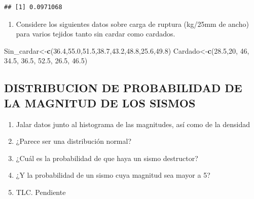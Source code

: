 \documentclass[
]{article}
\newenvironment{Shaded}{\begin{snugshade}}{\end{snugshade}}
\newcommand{\DecValTok}[1]{\textcolor[rgb]{0.00,0.00,0.81}{#1}}
\newcommand{\FloatTok}[1]{\textcolor[rgb]{0.00,0.00,0.81}{#1}}
\newcommand{\FunctionTok}[1]{\textcolor[rgb]{0.13,0.29,0.53}{\textbf{#1}}}
\newcommand{\NormalTok}[1]{#1}
\newcommand{\OtherTok}[1]{\textcolor[rgb]{0.56,0.35,0.01}{#1}}
\providecommand{\tightlist}{%
  \setlength{\itemsep}{0pt}\setlength{\parskip}{0pt}}
\begin{document}
\begin{verbatim}
## [1] 0.0971068
\end{verbatim}

\begin{enumerate}
\def\labelenumi{\arabic{enumi})}
\setcounter{enumi}{1}
\tightlist
\item
  Considere los siguientes datos sobre carga de ruptura (kg/25mm de
  ancho) para varios tejidos tanto sin cardar como cardados.
\end{enumerate}

\begin{Shaded}
\begin{Highlighting}[]
\NormalTok{Sin\_cardar}\OtherTok{\textless{}{-}}\FunctionTok{c}\NormalTok{(}\FloatTok{36.4}\NormalTok{,}\FloatTok{55.0}\NormalTok{,}\FloatTok{51.5}\NormalTok{,}\FloatTok{38.7}\NormalTok{,}\FloatTok{43.2}\NormalTok{,}\FloatTok{48.8}\NormalTok{,}\FloatTok{25.6}\NormalTok{,}\FloatTok{49.8}\NormalTok{)}
\NormalTok{Cardado}\OtherTok{\textless{}{-}}\FunctionTok{c}\NormalTok{(}\FloatTok{28.5}\NormalTok{,}\DecValTok{20}\NormalTok{, }\DecValTok{46}\NormalTok{, }\FloatTok{34.5}\NormalTok{,   }\FloatTok{36.5}\NormalTok{,   }\FloatTok{52.5}\NormalTok{,   }\FloatTok{26.5}\NormalTok{,   }\FloatTok{46.5}\NormalTok{)}
\end{Highlighting}
\end{Shaded}

\subsection{DISTRIBUCION DE PROBABILIDAD DE LA MAGNITUD DE LOS
SISMOS}\label{distribucion-de-probabilidad-de-la-magnitud-de-los-sismos}

\begin{enumerate}
\def\labelenumi{\arabic{enumi})}
\tightlist
\item
  Jalar datos junto al histograma de las magnitudes, así como de la
  densidad\\
\item
  ¿Parece ser una distribución normal?\\
\item
  ¿Cuál es la probabilidad de que haya un sismo destructor?\\
\item
  ¿Y la probabilidad de un sismo cuya magnitud sea mayor a 5?\\
\item
  TLC. Pendiente
\end{enumerate}
\end{document}
